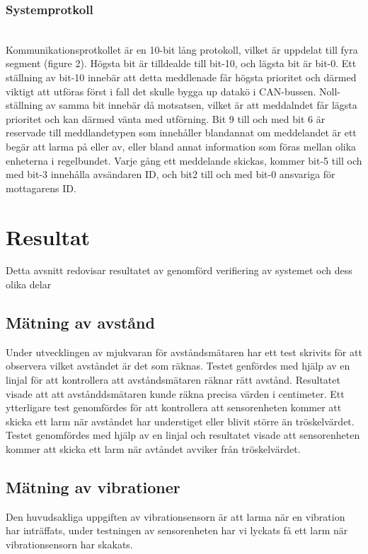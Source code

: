 \documentclass{article}
\begin{document}
\subsubsection{Systemprotkoll}\\
Kommunikationsprotkollet är en 10-bit lång protokoll, vilket är uppdelat till fyra segment (figure 2). Högsta bit är tilldealde till bit-10, och lägsta bit är bit-0. Ett ställning av bit-10 innebär att detta meddlenade får högsta prioritet och därmed viktigt att utföras först i fall det skulle bygga up datakö i CAN-bussen. Noll-ställning av samma bit innebär då motsatsen, vilket är att meddalndet får lägsta prioritet och kan därmed vänta med utförning. Bit 9 till och med bit 6 är reservade till meddlandetypen som innehåller blandannat om meddelandet är ett begär att larma på eller av, eller bland annat information som föras mellan olika enheterna i regelbundet. Varje gång ett meddelande skickas, kommer bit-5 till och med bit-3 innehålla avsändaren ID, och bit2 till och med bit-0 ansvariga för mottagarens ID. 

\section{Resultat}
Detta avsnitt redovisar resultatet av genomförd verifiering av systemet och dess olika delar

\subsection{Mätning av avstånd}
Under utvecklingen av mjukvaran för avståndsmätaren har ett test skrivits för att observera vilket avståndet är det som räknas. Testet genfördes med hjälp av en linjal för att kontrollera att avståndsmätaren räknar rätt avstånd. Resultatet visade att att avstånddsmätaren kunde räkna precisa värden i centimeter. Ett ytterligare test genomfördes för att kontrollera att sensorenheten kommer att skicka ett larm när avståndet har understiget eller blivit större än tröskelvärdet. Testet genomfördes med hjälp av en linjal och resultatet visade att sensorenheten kommer att skicka ett larm när avtåndet avviker från tröskelvärdet. 

\subsection{Mätning av vibrationer}
Den huvudsakliga uppgiften av vibrationsensorn är att larma när en vibration har inträffats, under testningen av sensorenheten har vi lyckats få ett larm när vibrationsensorn har skakats.
\end{document}
